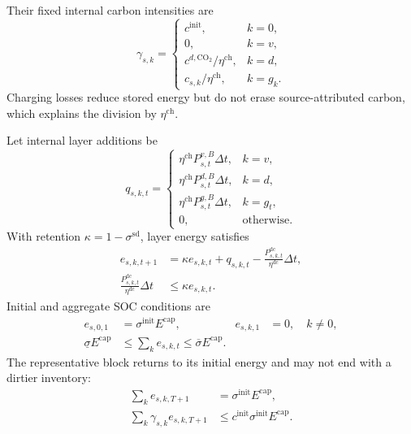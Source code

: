 \documentclass[times]{elsarticle}
\begin{document}
Their fixed internal carbon intensities are
\begin{equation}
\gamma_{s,k}=
\begin{cases}
c^{\mathrm{init}},&k=0,\\
0,&k=v,\\
c^{d,\mathrm{CO_2}}/\eta^{\mathrm{ch}},&k=d,\\
c_{s,k}/\eta^{\mathrm{ch}},&k=g_k.
\end{cases}
\label{eq:layer_intensity}
\end{equation}
Charging losses reduce stored energy but do not erase source-attributed carbon,
which explains the division by $\eta^{\mathrm{ch}}$.

Let internal layer additions be
\begin{equation}
q_{s,k,t}=
\begin{cases}
\eta^{\mathrm{ch}}P^{v,B}_{s,t}\Delta t,&k=v,\\
\eta^{\mathrm{ch}}P^{d,B}_{s,t}\Delta t,&k=d,\\
\eta^{\mathrm{ch}}P^{g,B}_{s,t}\Delta t,&k=g_t,\\
0,&\text{otherwise}.
\end{cases}
\label{eq:additions}
\end{equation}
With retention $\kappa=1-\sigma^{\mathrm{sd}}$, layer energy satisfies
\begin{align}
e_{s,k,t+1}&=\kappa e_{s,k,t}+q_{s,k,t}
-\frac{P^{\mathrm{dc}}_{s,k,t}}{\eta^{\mathrm{dc}}}\Delta t,
\label{eq:layer_energy}\\
\frac{P^{\mathrm{dc}}_{s,k,t}}{\eta^{\mathrm{dc}}}\Delta t
&\le\kappa e_{s,k,t}.
\label{eq:available_energy}
\end{align}
Initial and aggregate SOC conditions are
\begin{align}
e_{s,0,1}&=\sigma^{\mathrm{init}}E^{\mathrm{cap}},
&e_{s,k,1}&=0,\quad k\ne0,
\label{eq:initial_layers}\\
\underline\sigma E^{\mathrm{cap}}
&\le\sum_ke_{s,k,t}\le\overline\sigma E^{\mathrm{cap}}.
\label{eq:soc}
\end{align}
The representative block returns to its initial energy and may not end with a
dirtier inventory:
\begin{align}
\sum_ke_{s,k,T+1}&=\sigma^{\mathrm{init}}E^{\mathrm{cap}},
\label{eq:terminal_energy}\\
\sum_k\gamma_{s,k}e_{s,k,T+1}
&\le c^{\mathrm{init}}\sigma^{\mathrm{init}}E^{\mathrm{cap}}.
\label{eq:terminal_carbon}
\end{align}
\end{document}
